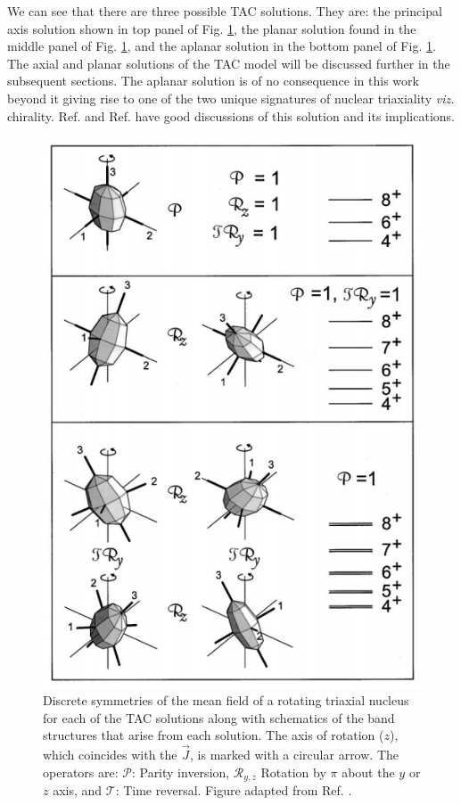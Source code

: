 We can see that there are three possible TAC solutions. They are: the principal axis solution shown in top panel of Fig. \ref{fig:chp2-TAC-solution-types}, the planar solution found in the middle panel of Fig. \ref{fig:chp2-TAC-solution-types}, and the aplanar solution in the bottom panel of Fig. \ref{fig:chp2-TAC-solution-types}. The axial and planar solutions of the TAC model will be discussed further in the subsequent sections. The aplanar solution is of no consequence in this work beyond it giving rise to one of the two unique signatures of nuclear triaxiality \emph{viz.} chirality. Ref. \cite{frauendorfTAC} and Ref. \cite{frauendorfChirality} have good discussions of this solution and its implications.
\begin{figure}[t!]
\centerline{\includegraphics[height=0.6\textheight]{./img/c2/tacsolutions.png}}
	\caption{Discrete symmetries of the mean field of a rotating triaxial nucleus for each of the TAC solutions along with schematics of the band structures that arise from each solution. The axis of rotation ($z$), which coincides with the $\vec{J}$, is marked with a circular arrow. The operators are: $\mathscr{P}$: Parity inversion, $\mathscr{R}_{y,z}$ Rotation by $\pi$ about the $y$ or $z$ axis, and $\mathscr{T}$: Time reversal. Figure adapted from Ref. \cite{frauendorfTAC}.\label{fig:chp2-TAC-solution-types}}
\end{figure}

